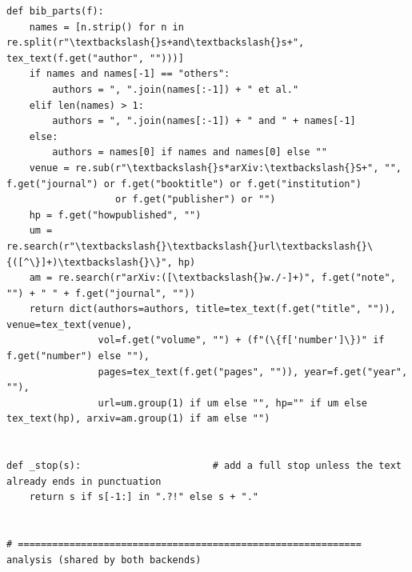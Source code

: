 \documentclass[10pt,a4paper]{article}
\begin{document}
\begin{Verbatim}
def bib_parts(f):
    names = [n.strip() for n in re.split(r"\textbackslash{}s+and\textbackslash{}s+", tex_text(f.get("author", "")))]
    if names and names[-1] == "others":
        authors = ", ".join(names[:-1]) + " et al."
    elif len(names) > 1:
        authors = ", ".join(names[:-1]) + " and " + names[-1]
    else:
        authors = names[0] if names and names[0] else ""
    venue = re.sub(r"\textbackslash{}s*arXiv:\textbackslash{}S+", "", f.get("journal") or f.get("booktitle") or f.get("institution")
                   or f.get("publisher") or "")
    hp = f.get("howpublished", "")
    um = re.search(r"\textbackslash{}\textbackslash{}url\textbackslash{}\{([^\}]+)\textbackslash{}\}", hp)
    am = re.search(r"arXiv:([\textbackslash{}w./-]+)", f.get("note", "") + " " + f.get("journal", ""))
    return dict(authors=authors, title=tex_text(f.get("title", "")), venue=tex_text(venue),
                vol=f.get("volume", "") + (f"(\{f['number']\})" if f.get("number") else ""),
                pages=tex_text(f.get("pages", "")), year=f.get("year", ""),
                url=um.group(1) if um else "", hp="" if um else tex_text(hp), arxiv=am.group(1) if am else "")


def _stop(s):                       # add a full stop unless the text already ends in punctuation
    return s if s[-1:] in ".?!" else s + "."


# ============================================================ analysis (shared by both backends)
\end{Verbatim}
\end{document}
